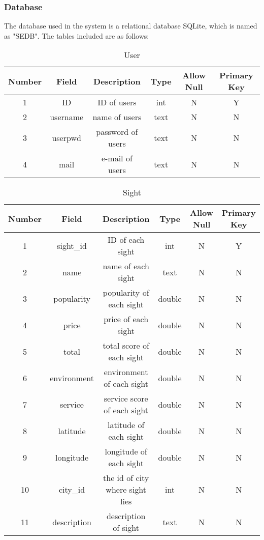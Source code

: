 \documentclass[10pt]{article}
\begin{document}
\subsubsection{Database}
The database used in the system is a relational database SQLite, which is named as "SEDB". The tables included are as follows:
\begin{table}[htb]
	\centering

	\begin{tabular}{c|c|c|c|c|c}
		\hline
		Number&Field&Description&Type&Allow Null&Primary Key\\
		\hline
		1&ID&ID of users&int&N&Y\\
		\hline
		2&username&name of users&text&N&N\\
		\hline
		3&userpwd&password of users&text&N&N\\
		\hline
		4&mail&e-mail of users&text&N&N\\
		\hline
   \end{tabular}
	
	\caption{User}
\end{table}

\newpage

\begin{table}[htb]
	\centering

	\begin{tabular}{c|c|c|c|c|c}
		\hline
		Number&Field&Description&Type&Allow Null&Primary Key\\
		\hline
		1&sight\_id&ID of each sight&int&N&Y\\
		\hline
		2&name&name of each sight&text&N&N\\
		\hline
		3&popularity&popularity of each sight&double&N&N\\
		
		\hline
		4&price&price of each sight&double&N&N\\
		\hline
		5&total&total score of each sight&double&N&N\\
		\hline
		6&environment&environment of each sight&double&N&N\\
		\hline
		7&service&service score of each sight&double&N&N\\
		\hline
		8&latitude&latitude of each sight&double&N&N\\
		\hline
		9&longitude&longitude of each sight&double&N&N\\
		\hline
		10&city\_id&the id of city where sight lies&int&N&N\\
		\hline
		11&description&description of sight&text&N&N\\
		\hline
   	\end{tabular}
	\caption{Sight}
\end{table}
\end{document}
